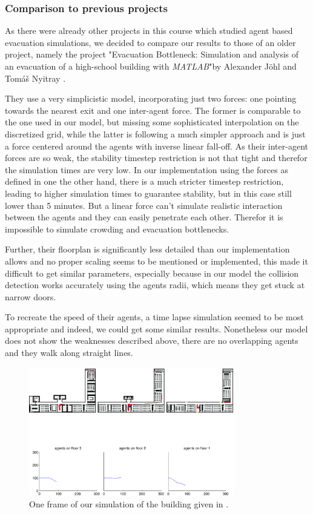 \documentclass[11pt]{article}
\begin{document}
\subsubsection{Comparison to previous projects}

As there were already other projects in this course which studied agent based evacuation simulations, 
we decided to compare our results to those of an older project, namely the project 
"Evacuation Bottleneck: Simulation and analysis of an evacuation of a high-school building with \textit{MATLAB}"by
Alexander J\"ohl and Tom\'{a}\v{s} Nyitray \cite{oldproj}.

They use a very simplicistic model, incorporating just two forces: 
one pointing towards the nearest exit and one inter-agent force. The former is comparable to the one used in our model, but missing some
sophisticated interpolation on the discretized grid, while the latter is following a much simpler approach 
and is just a force centered around the agents with inverse linear fall-off.
As their inter-agent forces are so weak, the stability timestep restriction is not that tight and therefor the simulation times are very low.
In our implementation using the forces as defined in \cite{SDFEP} one the other hand, 
there is a much stricter timestep restriction, leading to higher simulation times to guarantee stability, but in this case still lower than 5 minutes.
But a linear force can't simulate realistic interaction between the agents and they can
easily penetrate each other. Therefor it is impossible to simulate crowding and evacuation bottlenecks.

Further, their floorplan is significantly less detailed than our implementation allows and no proper scaling seems
to be mentioned or implemented, this made it difficult to get similar parameters, especially because in our 
model the collision detection works accurately using the agents radii, which means they get stuck at narrow doors.

To recreate the speed of their agents, a time lapse simulation seemed to be most appropriate and indeed, we could get some similar 
results. Nonetheless our model does not show the weaknesses described above, there are no overlapping agents and they walk along straight lines.

\begin{figure}[ht]
\centering
\includegraphics[width=0.8\textwidth]{./images/swsl.png}
\caption{One frame of our simulation of the building given in \cite{oldproj}.} 
\label{swsl}
\end{figure}
\end{document}
